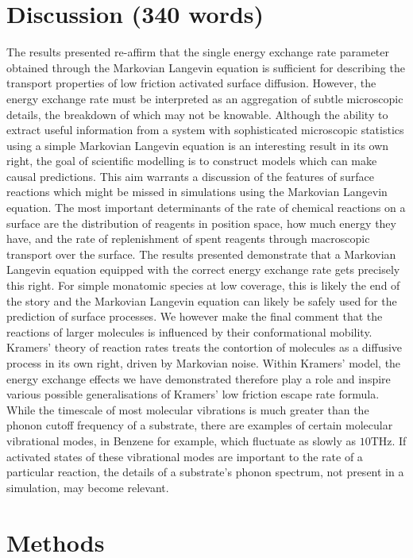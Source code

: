 \documentclass[7pt]{article}
\newcommand{\THz}{\si{\tera\hertz}}
\begin{document}
\section*{Discussion (340 words)}

The results presented re-affirm that the single energy exchange rate parameter obtained through the Markovian Langevin equation is sufficient for describing the transport properties of low friction activated surface diffusion. However, the energy exchange rate must be interpreted as an aggregation of subtle microscopic details, the breakdown of which may not be knowable. Although the ability to extract useful information from a system with sophisticated microscopic statistics using a simple Markovian Langevin equation is an interesting result in its own right, the goal of scientific modelling is to construct models which can make causal predictions. This aim warrants a discussion of the features of surface reactions which might be missed in simulations using the Markovian Langevin equation. The most important determinants of the rate of chemical reactions on a surface are the distribution of reagents in position space, how much energy they have, and the rate of replenishment of spent reagents through macroscopic transport over the surface. The results presented demonstrate that a Markovian Langevin equation equipped with the correct energy exchange rate gets precisely this right. For simple monatomic species at low coverage, this is likely the end of the story and the Markovian Langevin equation can likely be safely used for the prediction of surface processes. We however make the final comment that the reactions of larger molecules is influenced by their conformational mobility. Kramers' theory of reaction rates treats the contortion of molecules as a diffusive process in its own right, driven by Markovian noise\cite{Kramers, Zwanzig}. Within Kramers' model, the energy exchange effects we have demonstrated therefore play a role and inspire various possible generalisations of Kramers' low friction escape rate formula. While the timescale of most molecular vibrations is much greater than the phonon cutoff frequency of a substrate, there are examples of certain molecular vibrational modes, in Benzene for example\cite{Wang2020}, which fluctuate as slowly as $10\THz$. If activated states of these vibrational modes are important to the rate of a particular reaction, the details of a substrate's phonon spectrum, not present in a simulation, may become relevant. 

\section*{Methods}
\end{document}
